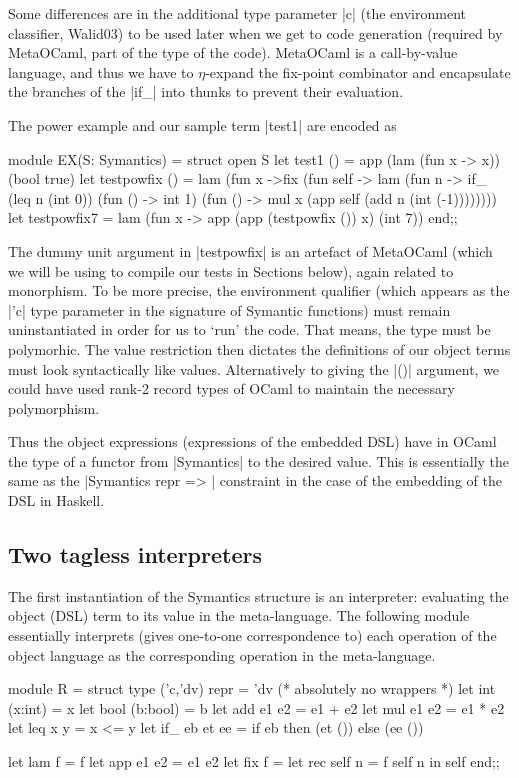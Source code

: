 \documentclass[preprint]{sigplanconf}
\begin{document}
Some differences are in the additional type parameter |c| (the
environment classifier, Walid03) to be used later when we get to code
generation (required by MetaOCaml, part of the type of the
code). MetaOCaml is a call-by-value language, and thus we have to 
$\eta$-expand
the fix-point combinator and encapsulate the branches of the |if_|
into thunks to prevent their evaluation. 

The power example and our sample term |test1| are encoded as
\begin{code}
module EX(S: Symantics) = struct
 open S
 let test1 () = app (lam (fun x -> x)) (bool true)
 let testpowfix () = 
   lam (fun x ->fix (fun self -> lam (fun n ->
     if_ (leq n (int 0)) (fun () -> int 1)
         (fun () -> mul x (app self 
                               (add n (int (-1))))))))
 let testpowfix7 = 
    lam (fun x -> app (app (testpowfix ()) x) (int 7))
end;;
\end{code}
The dummy unit argument in |testpowfix| is an artefact of MetaOCaml
(which we will be using to compile our tests in Sections below),
again related to monorphism. To be
more precise, the environment qualifier (which appears as the |'c|
type parameter in the signature of Symantic functions) must remain
uninstantiated in order for us to `run' the code. That means, the type
must be polymorhic. The value restriction then dictates 
the definitions of our object terms must look syntactically like
values. Alternatively to giving the |()| argument, we could have used
rank-2 record types of OCaml to maintain the necessary polymorphism.

Thus the object expressions (expressions of the embedded DSL) have in
OCaml the type of a functor from |Symantics| to the desired value. This
is essentially the same as the |Symantics repr => | constraint in the case of
the embedding of the DSL in Haskell.

\subsection{Two tagless interpreters}
The first instantiation of the Symantics structure is an interpreter:
evaluating the object (DSL) term to its value in the meta-language. 
The following module essentially interprets (gives one-to-one
correspondence to) each operation of the object language as the
corresponding operation in the meta-language.
\begin{code}
module R  = struct
  type ('c,'dv) repr = 'dv (* absolutely no wrappers *)
  let int  (x:int)  = x
  let bool (b:bool) = b
  let add  e1 e2    = e1 + e2
  let mul  e1 e2    = e1 * e2
  let leq  x y      = x <= y
  let if_  eb et ee = if eb then (et ()) else (ee ())

  let lam f         = f
  let app e1 e2     = e1 e2
  let fix f         = let rec self n = f self n in self
end;;
\end{code}
\end{document}
